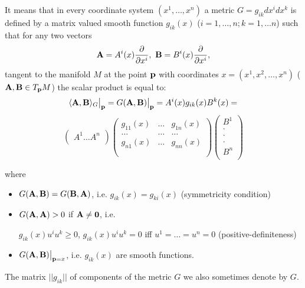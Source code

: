 \documentclass[12pt]{article}
\theoremstyle{theorem}
\numberwithin{equation}{section}
\begin{document}
  It means that in every coordinate system $(x^1,\dots,x^n)$
  a metric $G=g_{ik}dx^idx^k$ is defined by a matrix valued smooth function $g_{ik}(x)$ ($i=1,\dots,n;k=1,\dots n$)
  such that for any two vectors
       $$
  {\bf A}=A^i(x){\partial\over \partial x^i},\,\, {\bf B}=B^i(x){\partial\over \partial x^i},
      $$
tangent to the manifold $M$ at the point ${\bf p}$ with coordinates $x=(x^1,x^2,\dots,x^n)$ (${\bf A},{\bf B}\in T_{{\bf p}}M$)
the scalar product is equal to:
              $$
              \langle{\bf A},{\bf B}\rangle_G\big\vert_{\bf p}= G({\bf A},{\bf B})\big\vert_{\bf p}=
A^i(x)g_{ik}(x)B^k(x)=
            $$
            \begin{equation}\label{scalarproduct}
  \begin{pmatrix}
   A^1 \dots A^n\\
   \end{pmatrix}
  \begin{pmatrix}
     g_{11}(x)&\dots &g_{1n}(x)\\
      \dots &\dots & \dots \\
         g_{n1}(x)&\dots &g_{nn}(x)\\  \\
   \end{pmatrix}
\begin{pmatrix}
   B^1\\
     \cdot \\
   \cdot\\
   \cdot\\
   B^n\\
   \end{pmatrix}
\end{equation}

where
\begin{itemize}

  \item  $G({\bf A},{\bf B})=G({\bf B},{\bf A})$, i.e.  $g_{ik}(x)=g_{ki}(x)$ (symmetricity condition)

    \item
       $G({\bf A},{\bf A})>0$ if $\bf A\not=0$, i.e.

    $g_{ik}(x)u^iu^k\geq 0$, $g_{ik}(x)u^iu^k=0$ iff $u^1=\dots=u^n=0$  (positive-definiteness)

   \item  $G({\bf A},{\bf B})\big\vert_{{\bf p}=x}$, i.e. $g_{ik}(x)$ are smooth functions.


\end{itemize}


 The matrix $||g_{ik}||$ of components of 
the metric $G$ we also sometimes denote by $G$.
\end{document}
